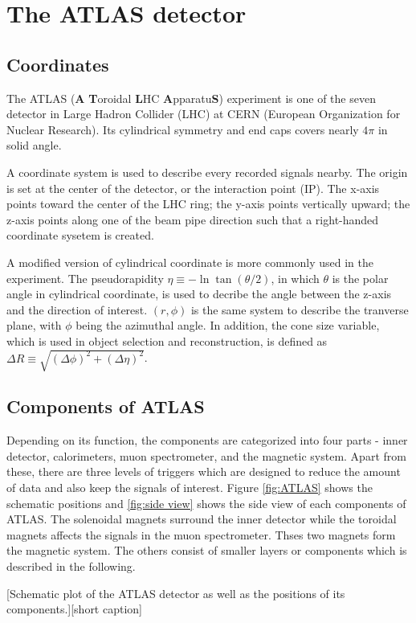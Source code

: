 \documentclass[class=NCU_thesis, crop=false]{standalone}
\begin{document}
\chapter{The ATLAS detector}
\section{Coordinates}
	The ATLAS (\textbf{A} \textbf{T}oroidal \textbf{L}HC \textbf{A}pparatu\textbf{S}) experiment is one of the seven detector in Large Hadron Collider (LHC) at CERN (European Organization for Nuclear Research). Its cylindrical symmetry and end caps covers nearly $4\pi$ in solid angle.
	
	A coordinate system is used to describe every recorded signals nearby. The origin is set at the center of the detector, or the interaction point (IP). The x-axis points toward the center of the LHC ring; the y-axis points vertically upward; the z-axis points along one of the beam pipe direction such that a right-handed coordinate sysetem is created.
	
	A modified version of cylindrical coordinate is more commonly used in the experiment. The pseudorapidity $\eta \equiv -\ln\tan(\theta / 2)$, in which $\theta$ is the polar angle in cylindrical coordinate, is used to decribe the angle between the z-axis and the direction of interest. $(r, \phi)$ is the same system to describe the tranverse plane, with $\phi$ being the azimuthal angle. In addition, the cone size variable, which is used in object selection and reconstruction, is defined as $\Delta R \equiv \sqrt{(\Delta \phi)^2 + (\Delta \eta)^2}$.

\section{Components of ATLAS}
	Depending on its function, the components are categorized into four parts - inner detector, calorimeters, muon spectrometer, and the magnetic system. Apart from these, there are three levels of triggers which are designed to reduce the amount of data and also keep the signals of interest. Figure \ref{fig:ATLAS} shows the schematic positions and \ref{fig:side view} shows the side view of each components of ATLAS. The solenoidal magnets surround the inner detector while the toroidal magnets affects the signals in the muon spectrometer. Thses two magnets form the magnetic system. The others consist of smaller layers or components which is described in the following.
	
	[Schematic plot of the ATLAS detector as well as the positions of its components.][short caption]
	
\end{document}
